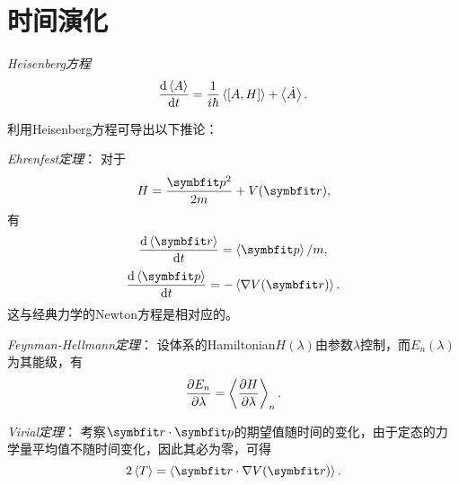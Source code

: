 \section{时间演化}

\emph{Heisenberg方程}
\begin{equation}
    \frac{\dd \expval{A}}{\dd t} = \frac{1}{i\hbar}\expval{[A,H]} + \expval{\dot{A}}.
\end{equation}

利用Heisenberg方程可导出以下推论：

\emph{Ehrenfest定理}：
对于
\begin{equation}
    H = \frac{\pp^2}{2m} + V(\rr),
\end{equation}
有
\begin{equation}
    \frac{\dd \expval{\rr}}{\dd t} = \expval{\pp}/m,
\end{equation}
\begin{equation}
    \frac{\dd \expval{\pp}}{\dd t} = -\expval{\nabla V(\rr)}.
\end{equation}
这与经典力学的Newton方程是相对应的。

\emph{Feynman-Hellmann定理}：
设体系的Hamiltonian$H(\lambda)$由参数$\lambda$控制，而$E_n(\lambda)$为其能级，有
\begin{equation}
    \frac{\partial E_n}{\partial \lambda} = \expval{\frac{\partial H}{\partial\lambda}}_n.
\end{equation}

\emph{Virial定理}：
考察$\rr\cdot\pp$的期望值随时间的变化，由于定态的力学量平均值不随时间变化，因此其必为零，可得
\begin{equation}
    2\expval{T} = \expval{\rr\cdot\nabla V(\rr)}.
\end{equation}
